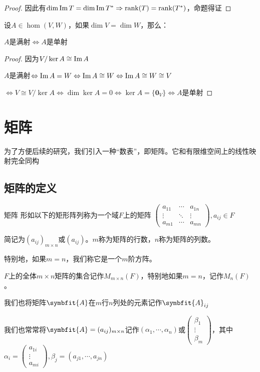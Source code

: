 \documentclass[12pt, a4paper, oneside, UTF8]{ctexbook}
\begin{document}
\begin{para}{0}
\begin{proof}
							因此有$\dim \operatorname{Im} T = \dim \operatorname{Im} T^* \Rightarrow \operatorname{rank}(T)=\operatorname{rank}(T^*)$，命题得证
						\end{proof}
					\point{}
						\begin{proposition}
							设$A \in \hom(V,W)$，如果$\dim V=\dim W$，那么：

							$A$是满射$\Leftrightarrow A$是单射
						\end{proposition}
						\begin{proof}
							因为$V/\ker A \cong \operatorname{Im} A$

							$A$是满射$\Leftrightarrow \operatorname{Im} A = W \Leftrightarrow \operatorname{Im} A \cong W \Leftrightarrow \operatorname{Im} A \cong W \cong V$

							$\Leftrightarrow V \cong V/\ker A \Leftrightarrow \dim \ker A = 0 \Leftrightarrow \ker A = \{\mathbf{0}_V\} \Leftrightarrow A$是单射
						\end{proof}
				\end{para}
	\section{矩阵}
		为了方便后续的研究，我们引入一种“数表”，即矩阵。它和有限维空间上的线性映射完全同构
		\subsection{矩阵的定义}
			\begin{defn}{矩阵}{}
				形如以下的矩形阵列称为一个域$F$上的矩阵
				$\begin{pmatrix}
					a_{11} & \cdots & a_{1n} \\
					\vdots & \ddots & \vdots \\
					a_{m1} & \cdots & a_{mn}
				\end{pmatrix},a_{ij} \in F$

				简记为$(a_{ij})_{m \times n}$或$(a_{ij})$。$m$称为矩阵的行数，$n$称为矩阵的列数。

				特别地，如果$m=n$，我们称它是一个$m$阶方阵。

				$F$上的全体$m \times n$矩阵的集合记作$M_{m \times n} (F)$，特别地如果$m=n$，记作$M_n (F)$。

				我们也将矩阵$\symbfit{A}$在$m$行$n$列处的元素记作$\symbfit{A}_{ij}$
			\end{defn}
			我们也常常将$\symbfit{A}=(a_{ij})_{m \times n}$记作$(\alpha_1,\cdots,\alpha_n)$或$\begin{pmatrix}
				\beta_1 \\
				\vdots \\
				\beta_m
			\end{pmatrix}$，其中$\alpha_i = \begin{pmatrix}
				a_{1i} \\
				\vdots \\
				a_{mi}
			\end{pmatrix},\beta_j = (a_{j1},\cdots,a_{jn})$
\end{document}
